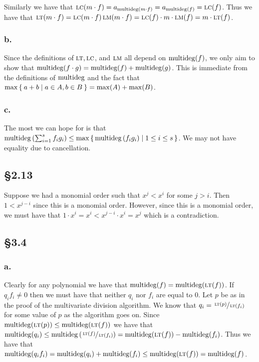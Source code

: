 \documentclass[letterpaper]{article}
\begin{document}
Similarly we have that $\operatorname{\textsc{lc}}(m \cdot f) = a_{\operatorname{multideg}(m \cdot f)} = a_{\operatorname{multideg}(f)} = \operatorname{\textsc{lc}}(f)$.
Thus we have that $\operatorname{\textsc{lt}}(m \cdot f) = \operatorname{\textsc{lc}}(m \cdot f) \operatorname{\textsc{lm}}(m \cdot f) = \operatorname{\textsc{lc}}(f) \cdot m \cdot \operatorname{\textsc{lm}}(f) = m \cdot \operatorname{\textsc{lt}}(f)$.

\subsubsection*{b.}

Since the definitions of $\operatorname{\textsc{lt}}, \operatorname{\textsc{lc}}$, and $\operatorname{\textsc{lm}}$ all depend on $\operatorname{multideg}(f)$, we only aim to show that $\operatorname{multideg}(f \cdot g) = \operatorname{multideg}(f) + \operatorname{multideg}(g)$.
This is immediate from the definitions of $\operatorname{multideg}$ and the fact that $\max\Set{a + b | a \in A, b \in B} = \max(A) + \max(B)$.

\subsubsection*{c.}

The most we can hope for is that $\mdeg\pqty{\sum_{i = 1}^{s} f_{i} g_{i}} \leq \max\set{\mdeg\pqty{f_{i} g_{i}} | 1 \leq i \leq s}$.
We may not have equality due to cancellation.

\subsection*{\S 2.13}

Suppose we had a monomial order such that $x^{j} < x^{i}$ for some $j > i$.
Then $1 < x^{j - i}$ since this is a monomial order.
However, since this is a monomial order, we must have that $1 \cdot x^{i} = x^{i} < x^{j - i} \cdot x^{i} = x^{j}$ which is a contradiction.

\clearpage

\subsection*{\S 3.4}

\subsubsection*{a.}

Clearly for any polynomial we have that $\operatorname{multideg}(f) = \operatorname{multideg}(\operatorname{\textsc{lt}}(f))$.
If $q_{i} f_{i} \neq 0$ then we must have that neither $q_{i}$ nor $f_{i}$ are equal to $0$.
Let $p$ be as in the proof of the multivariate division algorithm.
We know that $q_{i} = \sfrac{\operatorname{\textsc{lt}}(p)}{\operatorname{\textsc{lt}}(f_{i})}$ for some value of $p$ as the algorithm goes on.
Since $\operatorname{multideg}(\operatorname{\textsc{lt}}(p)) \leq \operatorname{multideg}(\operatorname{\textsc{lt}}(f))$ we have that $\mdeg(q_{i}) \leq \mdeg\pqty{\sfrac{\lt(f)}{\lt(f_{i})}} = \mdeg(\lt(f)) - \mdeg(f_{i})$.
Thus we have that $\operatorname{multideg}(q_{i}f_{i}) = \operatorname{multideg}(q_{i}) + \operatorname{multideg}(f_{i}) \leq \operatorname{multideg}(\operatorname{\textsc{lt}}(f)) = \operatorname{multideg}(f)$.
\end{document}
